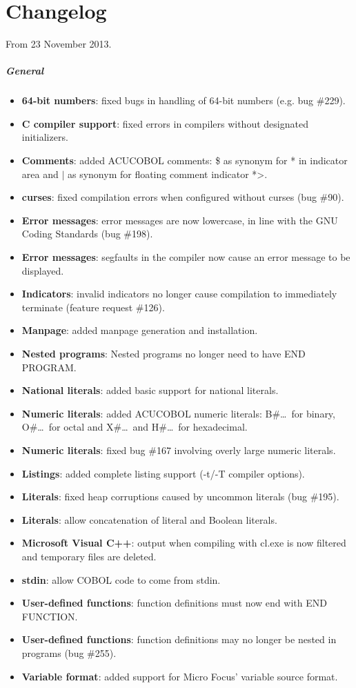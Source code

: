 \chapter{Changelog}

From 23 November 2013.

\paragraph{General}
\begin{itemize}
\item \textbf{64-bit numbers}: fixed bugs in handling of 64-bit numbers (e.g. bug \#229).
\item \textbf{C compiler support}: fixed errors in compilers without designated initializers.
\item \textbf{Comments}: added ACUCOBOL comments: \$ as synonym for * in indicator area and $\vert$ as synonym for floating comment indicator *>.
\item \textbf{curses}: fixed compilation errors when configured without curses (bug \#90).
\item \textbf{Error messages}: error messages are now lowercase, in line with the GNU Coding Standards (bug \#198).
\item \textbf{Error messages}: segfaults in the compiler now cause an error message to be displayed.
\item \textbf{Indicators}: invalid indicators no longer cause compilation to immediately terminate (feature request \#126).
\item \textbf{Manpage}: added manpage generation and installation.
\item \textbf{Nested programs}: Nested programs no longer need to have END PROGRAM.
\item \textbf{National literals}: added basic support for national literals.
\item \textbf{Numeric literals}: added ACUCOBOL numeric literals: B\#\ldots\, for binary, O\#\ldots\, for octal and X\#\ldots\, and H\#\ldots\, for hexadecimal.
\item \textbf{Numeric literals}: fixed bug \#167 involving overly large numeric literals.
\item \textbf{Listings}: added complete listing support (-t\slash{}-T compiler options).
\item \textbf{Literals}: fixed heap corruptions caused by uncommon literals (bug \#195).
\item \textbf{Literals}: allow concatenation of literal and Boolean literals.
\item \textbf{Microsoft Visual C++}: output when compiling with cl.exe is now filtered and temporary files are deleted.
\item \textbf{stdin}: allow COBOL code to come from stdin.
\item \textbf{User-defined functions}: function definitions must now end with END FUNCTION.
\item \textbf{User-defined functions}: function definitions may no longer be nested in programs (bug \#255).
\item \textbf{Variable format}: added support for Micro Focus' variable source format.
\end{itemize}

